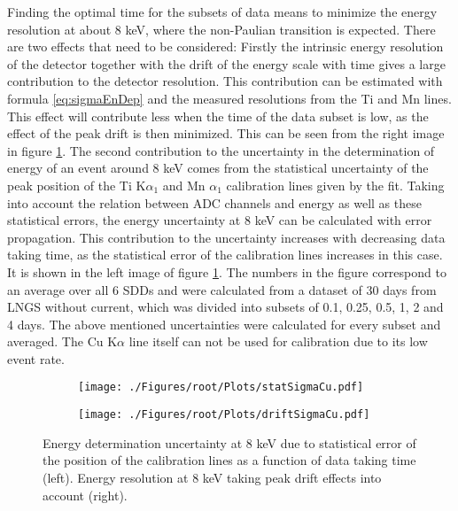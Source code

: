 Finding the optimal time for the subsets of data means to minimize the energy resolution at about 8 keV, where the non-Paulian transition is expected. There are two effects that need to be considered: Firstly the intrinsic energy resolution of the detector together with the drift of the energy scale with time gives a large contribution to the detector resolution. This contribution can be estimated with formula \ref{eq:sigmaEnDep} and the measured resolutions from the Ti and Mn lines. This effect will contribute less when the time of the data subset is low, as the effect of the peak drift is then minimized. This can be seen from the right image in figure \ref{fig:sigmaCu}. The second contribution to the uncertainty in the determination of energy of an event around 8 keV comes from the statistical uncertainty of the peak position of the Ti K$\alpha_{1}$ and Mn $\alpha_{1}$ calibration lines given by the fit. Taking into account the relation between ADC channels and energy as well as these statistical errors, the energy uncertainty at 8 keV can be calculated with error propagation. This contribution to the uncertainty increases with decreasing data taking time, as the statistical error of the calibration lines increases in this case. It is shown in the left image of figure \ref{fig:sigmaCu}. The numbers in the figure correspond to an average over all 6 SDDs and were calculated from a dataset of 30 days from LNGS without current, which was divided into subsets of 0.1, 0.25, 0.5, 1, 2 and 4 days. The above mentioned uncertainties were calculated for every subset and averaged. The Cu K$\alpha$ line itself can not be used for calibration due to its low event rate.
\begin{figure}[h]
 \centering
 \begin{subfigure}{.49\textwidth}
 \centering
 \texttt{[image: ./Figures/root/Plots/statSigmaCu.pdf]}
 \end{subfigure}
 \hfill
 \begin{subfigure}{.49\textwidth}
 \centering
 \texttt{[image: ./Figures/root/Plots/driftSigmaCu.pdf]}
 \end{subfigure}
 \caption{Energy determination uncertainty at 8 keV due to statistical error of the position of the calibration lines as a function of data taking time (left). Energy resolution at 8 keV taking peak drift effects into account (right).}
 \label{fig:sigmaCu}
\end{figure}

